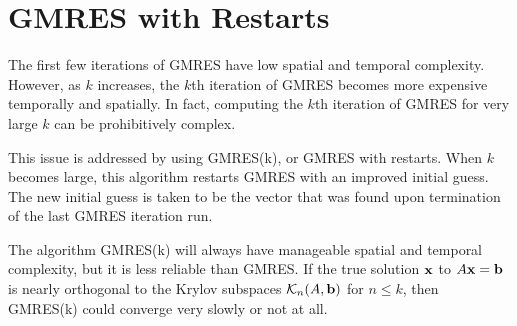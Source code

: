 \section*{GMRES with Restarts} %

The first few iterations of GMRES have low spatial and temporal complexity.
However, as $k$ increases, the $k$th iteration of GMRES becomes more expensive temporally and spatially.
In fact, computing the $k$th iteration of GMRES for very large $k$ can be prohibitively complex.

This issue is addressed by using GMRES(k), or GMRES with restarts.
When $k$ becomes large, this algorithm restarts GMRES with an improved initial guess.
The new initial guess is taken to be the vector that was found upon termination of the last GMRES iteration run.

The algorithm GMRES(k) will always have manageable spatial and temporal complexity, but it is less reliable than GMRES.
If the true solution $\mathbf{x}$ to $A\mathbf{x}=\mathbf{b}$ is nearly orthogonal to the Krylov subspaces $\mathcal{K}_n(A, \mathbf{b})$ for $n\leq k$, then GMRES(k) could converge very slowly or not at all.

